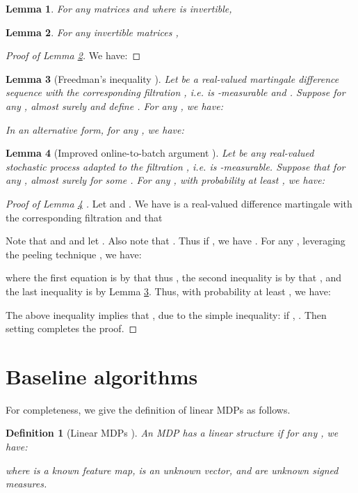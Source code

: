 \documentclass{article} \usepackage{iclr2023/iclr2023_conference,times}
\newtheorem{defn}{Definition}
\newtheorem{lemma}{Lemma}[section]
\begin{document}
\begin{lemma}
For any matrices  and  where  is invertible, 

\end{lemma}

\begin{lemma}
For any invertible matrices , 

\label{lemma: difference of two inverse matrices}
\end{lemma}
\begin{proof}[Proof of Lemma \ref{lemma: difference of two inverse matrices}]
We have: 

\end{proof}




\begin{lemma}[Freedman's inequality \citep{tropp2011freedman}]
Let  be a real-valued martingale difference sequence with the corresponding filtration , i.e.  is -measurable and . Suppose for any ,  almost surely and define . For any , we have:

In an alternative form, for any , we have: 

\label{lemma:freedman}
\end{lemma}

\begin{lemma}[Improved online-to-batch argument \cite{nguyen2022instance}]
Let  be any real-valued stochastic process adapted to the filtration , i.e.  is -measurable. Suppose that for any ,  almost surely for some . For any , with probability at least , we have:

\label{lemma:improved_online_to_batch}
\end{lemma}
\begin{proof}[Proof of Lemma \ref{lemma:improved_online_to_batch} ]
Let  and . We have  is a real-valued difference martingale with the corresponding filtration  and that

Note that   and  and let .
Also note that . Thus if , we have . For any , leveraging the peeling technique \citep{bartlett2005local}, we have:

where the first equation is by that  thus , the second inequality is by that , and the last inequality is by Lemma \ref{lemma:freedman}. Thus, with probability at least , we have:

The above inequality implies that , due to the simple inequality: if , . Then setting  completes the proof. 
\end{proof}
 \section{Baseline algorithms}
\label{section: baseline algorithms}
For completeness, we give the definition of linear MDPs as follows.
\begin{defn}[Linear MDPs \citep{yang2019sample,jin2020provably}]
An MDP has a linear structure if for any , we have: 

where  is a known feature map,  is an unknown vector, and  are unknown signed measures. 
\label{definition:linear_mdp}
\end{defn}
\end{document}
